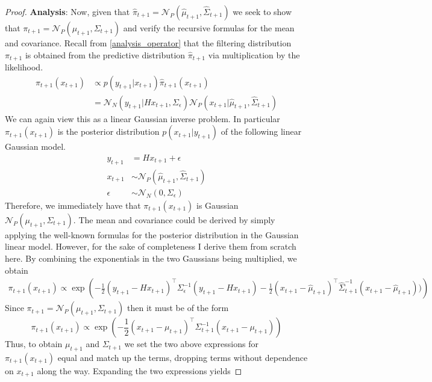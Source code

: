\documentclass[12pt]{article}
\begin{document}
\begin{proof}
\bigskip
\noindent
\textbf{Analysis}: Now, given that $\hat{\pi}_{t + 1} = \mathcal{N}_P(\hat{\mu}_{t + 1}, \hat{\Sigma}_{t + 1})$ we seek to show that 
$\pi_{t + 1} = \mathcal{N}_P(\mu_{t + 1}, \Sigma_{t + 1})$ and verify the recursive formulas for the mean and covariance. Recall from 
\ref{analysis_operator} that the filtering distribution $\pi_{t + 1}$ is obtained from the predictive distribution $\hat{\pi}_{t + 1}$ via 
multiplication by the likelihood. 
\begin{align*}
\pi_{t + 1}(x_{t + 1}) &\propto p(y_{t + 1}|x_{t + 1})\hat{\pi}_{t + 1}(x_{t+1}) \\
			       &= \mathcal{N}_N(y_{t + 1}|H x_{t+1}, \Sigma_\epsilon) \mathcal{N}_P(x_{t + 1}|\hat{\mu}_{t + 1}, \hat{\Sigma}_{t + 1})
\end{align*}
We can again view this as a linear Gaussian inverse problem. In particular $\pi_{t + 1}(x_{t + 1})$ is the posterior distribution $p(x_{t+1}|y_{t+1})$
of the following linear Gaussian model. 
\begin{align*}
y_{t + 1} &= Hx_{t + 1} + \epsilon \\
x_{t + 1} &\sim \mathcal{N}_{P}(\hat{\mu}_{t+1}, \hat{\Sigma}_{t+1}) \\
\epsilon &\sim \mathcal{N}_N(0, \Sigma_\epsilon)
\end{align*} 
Therefore, we immediately have that $\pi_{t + 1}(x_{t + 1})$ is Gaussian $\mathcal{N}_P(\mu_{t + 1}, \Sigma_{t + 1})$. The mean and covariance could 
be derived by simply applying the well-known formulas for the posterior distribution in the Gaussian linear model. However, for the sake of completeness 
I derive them from scratch here. By combining the exponentials in the two Gaussians being multiplied, we obtain 
\begin{align*}
\pi_{t + 1}(x_{t + 1}) \propto \exp\left(-\frac{1}{2} (y_{t+1} - Hx_{t+1})^{\top} \Sigma_\epsilon^{-1} (y_{t+1} - Hx_{t+1}) - \frac{1}{2} (x_{t+1} - \hat{\mu}_{t+1})^{\top} \hat{\Sigma}^{-1}_{t+1} (x_{t+1} - \hat{\mu}_{t+1}) ) \right)
\end{align*}
Since $\pi_{t + 1} = \mathcal{N}_P(\mu_{t + 1}, \Sigma_{t + 1})$ then it must be of the form 
\[\pi_{t + 1}(x_{t + 1}) \propto \exp\left(-\frac{1}{2} (x_{t + 1} - \mu_{t + 1})^{\top} \Sigma_{t+1}^{-1} (x_{t + 1} - \mu_{t + 1}) \right) \]
Thus, to obtain $\mu_{t + 1}$ and $\Sigma_{t + 1}$ we set the two above expressions for $\pi_{t + 1}(x_{t+1})$ equal and match up the terms, dropping 
terms without dependence on $x_{t+1}$ along the way. Expanding the two expressions yields

\end{proof}
\end{document}
